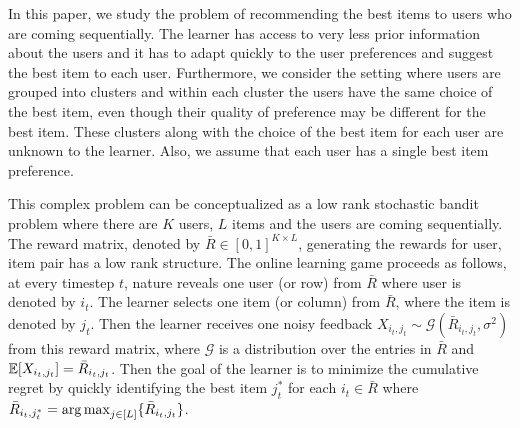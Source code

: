 In this paper, we study the problem of recommending the best items to users who are coming sequentially. The learner has access to very less prior information about the users and it has to adapt quickly to the user preferences and suggest the best item to each user. Furthermore, we consider the setting where users are grouped into clusters and within each cluster the users have the same choice of the best item, even though their quality of preference may be different for the best item. These clusters along with the choice of the best item for each user are unknown to the learner.  Also, we assume that each user has a single best item preference.

	This complex problem can be conceptualized as a low rank stochastic bandit problem where there are $K$ users, $L$ items and the users are coming sequentially. The reward matrix, denoted by $\bar{R}\in [0,1]^{K\times L}$,  generating the rewards for user, item pair has a low rank structure. The online learning game proceeds as follows, at every timestep $t$,  nature reveals one user (or row) from $\bar{R}$ where user is denoted by $i_t$. The learner selects one item (or column) from $\bar{R}$, where the item is denoted by $j_t$. Then the learner receives one noisy feedback $X_{i_t,j_t}\sim\mathcal{G}(\bar{R}_{i_t,j_t},\sigma^2)$ from this reward matrix, where $\mathcal{G}$ is a distribution over the entries in $\bar{R}$ and $\mathbb{E}[X_{i_t,j_t}] = \bar{R}_{i_t,j_t}$. Then the goal of the learner is to minimize the cumulative regret by quickly identifying the best item $j^*_t$ for each $i_t\in \bar{R}$ where $\bar{R}_{i_t,j^*_t} = \mathop{\rm arg\,max} _{j\in[L]}\lbrace \bar{R}_{i_t,j_t} \rbrace$. %